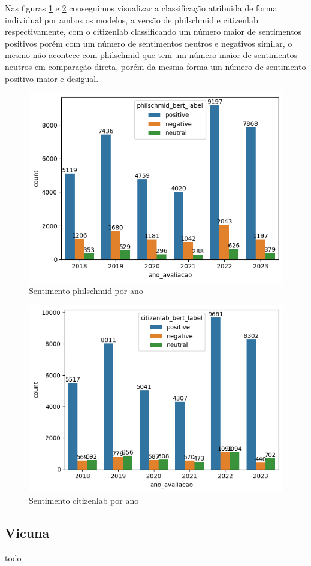 Nas figuras \ref{img:sentimento_phil} e \ref{img:sentimento_citizenlab} conseguimos visualizar a classificação atribuida de forma individual por ambos os modelos, a versão de philschmid e citizenlab respectivamente, com o citizenlab classificando um número maior de sentimentos positivos porém com um número de sentimentos neutros e negativos similar, o mesmo não acontece com philschmid que tem um número maior de sentimentos neutros em comparação direta, porém da mesma forma um número de sentimento positivo maior e desigual.

\begin{figure}
	\centering
	\includegraphics[width=.7\textwidth]{figs/bert/classificacao_phil.png}
	\caption{Sentimento philschmid por ano}
	\label{img:sentimento_phil}
\end{figure}

\begin{figure}
	\centering
	\includegraphics[width=.7\textwidth]{figs/bert/classificacao_citizenlab.png}
	\caption{Sentimento citizenlab por ano}
	\label{img:sentimento_citizenlab}
\end{figure}




\subsection{Vicuna}
\label{sec:resultados:subsec:vicuna}
todo


